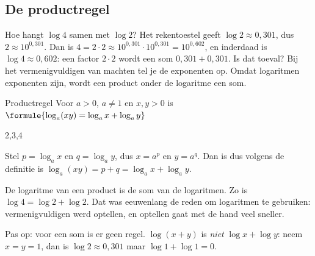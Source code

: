 \subsection{De productregel}

Hoe hangt $\log 4$ samen met $\log 2$? Het rekentoestel geeft $\log 2 \approx 0{,}301$, dus $2 \approx 10^{0{,}301}$. Dan is $4 = 2 \cdot 2 \approx 10^{0{,}301} \cdot 10^{0{,}301} = 10^{0{,}602}$, en inderdaad is $\log 4 \approx 0{,}602$: een factor $2 \cdot 2$ wordt een som $0{,}301 + 0{,}301$. Is dat toeval? Bij het vermenigvuldigen van machten tel je de exponenten op. Omdat logaritmen exponenten zijn, wordt een product onder de logaritme een som.

\begin{theorie}
\begin{stelling}{Productregel}
Voor $a > 0$, $a \neq 1$ en $x, y > 0$ is \qquad $\formule{\log_a (xy) = \log_a x + \log_a y}$
\end{stelling}
\begin{alleenvoor}{2,3,4}
\begin{bewijs}
Stel $p = \log_a x$ en $q = \log_a y$, dus $x = a^p$ en $y = a^q$. Dan is
dus volgens de definitie is $\log_a(xy) = p + q = \log_a x + \log_a y$.
\end{bewijs}
\end{alleenvoor}
\end{theorie}

De logaritme van een product is de som van de logaritmen. Zo is $\log 4 = \log 2 + \log 2$. Dat was eeuwenlang de reden om logaritmen te gebruiken: vermenigvuldigen werd optellen, en optellen gaat met de hand veel sneller.


Pas op: voor een som is er geen regel. $\log(x + y)$ is \textit{niet} $\log x + \log y$: neem $x = y = 1$, dan is $\log 2 \approx 0{,}301$ maar $\log 1 + \log 1 = 0$.

\begin{oefeningen}
\end{oefeningen}

